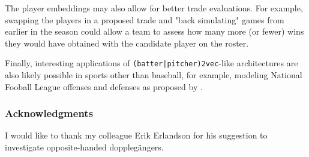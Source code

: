 \documentclass{article}
\begin{document}
The player embeddings may also allow for better trade evaluations. For example, swapping the players in a proposed trade and "back simulating" games from earlier in the season could allow a team to assess how many more (or fewer) wins they would have obtained with the candidate player on the roster.

Finally, interesting applications of \texttt{(batter|pitcher)2vec}-like architectures are also likely possible in sports other than baseball, for example, modeling National Fooball League offenses and defenses as proposed by \parencite{Alcorn2016}.

\subsubsection*{Acknowledgments}

I would like to thank my colleague Erik Erlandson for his suggestion to investigate opposite-handed dopplegängers.

\printbibliography
\end{document}
